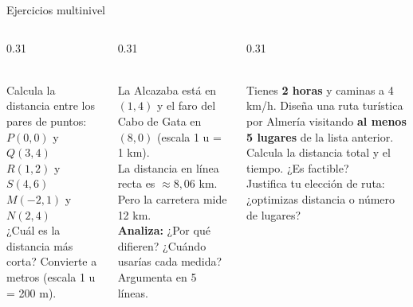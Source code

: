 \documentclass[aspectratio=169, 10pt, spanish]{beamer}
\begin{document}

\begin{frame}{Ejercicios multinivel}
  \begin{columns}[T]
    \begin{column}{0.31\textwidth}
      \begin{aplicarbox}
        \AlmFontFootnote{}\\[4pt]
        Calcula la distancia entre los pares de puntos:\\[3pt]
        $P(0,0)$ y $Q(3,4)$\\
        $R(1,2)$ y $S(4,6)$\\
        $M(-2,1)$ y $N(2,4)$\\[4pt]
        ¿Cuál es la distancia más corta?
        Convierte a metros (escala 1 u = 200 m).
      \end{aplicarbox}
    \end{column}
    \begin{column}{0.31\textwidth}
      \begin{analizarbox}
        \AlmFontFootnote{}\\[4pt]
        La Alcazaba está en $(1,4)$ y el
        faro del Cabo de Gata en $(8,0)$
        (escala 1 u = 1 km).\\[4pt]
        La distancia en línea recta es
        $\approx 8{,}06$ km. Pero la carretera
        mide 12 km.\\[4pt]
        \textbf{Analiza:} ¿Por qué difieren?
        ¿Cuándo usarías cada medida?
        Argumenta en 5 líneas.
      \end{analizarbox}
    \end{column}
    \begin{column}{0.31\textwidth}
      \begin{evaluarbox}
        \AlmFontFootnote{}\\[4pt]
        Tienes \textbf{2 horas} y caminas a
        4 km/h. Diseña una ruta turística
        por Almería visitando \textbf{al menos
        5 lugares} de la lista anterior.\\[4pt]
        Calcula la distancia total y el
        tiempo. ¿Es factible?\\[4pt]
        Justifica tu elección de ruta:
        ¿optimizas distancia o número de
        lugares?
      \end{evaluarbox}
    \end{column}
  \end{columns}
\end{frame}
\end{document}
